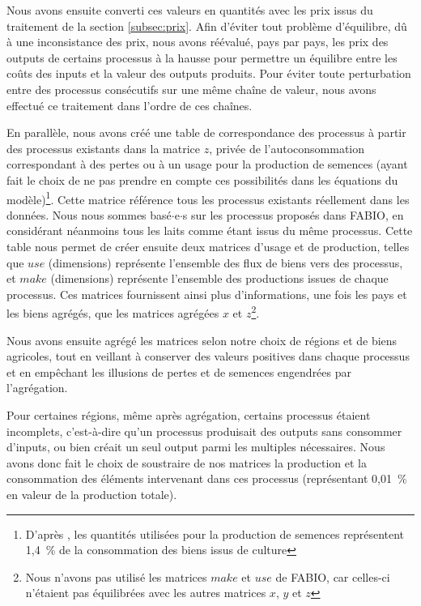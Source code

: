 Nous avons ensuite converti ces valeurs en quantités avec les prix issus du traitement de la section \ref{subsec:prix}. Afin d'éviter tout problème d'équilibre, dû à une inconsistance des prix, nous avons réévalué, pays par pays, les prix des outputs de certains processus à la hausse pour permettre un équilibre entre les coûts des inputs et la valeur des outputs produits. Pour éviter toute perturbation entre des processus consécutifs sur une même chaîne de valeur, nous avons effectué ce traitement dans l'ordre de ces chaînes.

En parallèle, nous avons créé une table de correspondance des processus à partir des processus existants dans la matrice $z$, privée de l'autoconsommation correspondant à des pertes ou à un usage pour la production de semences (ayant fait le choix de ne pas prendre en compte ces possibilités dans les équations du modèle)\footnote{D'après \cite{Bruckner2019}, les quantités utilisées pour la production de semences représentent 1,4~\% de la consommation des biens issus de culture}. Cette matrice référence tous les processus existants réellement dans les données. Nous nous sommes basé$\cdot$e$\cdot$s sur les processus proposés dans FABIO, en considérant néanmoins tous les laits comme étant issus du même processus. Cette table nous permet de créer ensuite deux matrices d'usage et de production, telles que $use$ (dimensions) représente l'ensemble des flux de biens vers des processus, et $make$ (dimensions) représente l'ensemble des productions issues de chaque processus. Ces matrices fournissent ainsi plus d'informations, une fois les pays et les biens agrégés, que les matrices agrégées $x$ et $z$\footnote{Nous n'avons pas utilisé les matrices $make$ et $use$ de FABIO, car celles-ci n'étaient pas équilibrées avec les autres matrices $x$, $y$ et $z$}.

Nous avons ensuite agrégé les matrices selon notre choix de régions et de biens agricoles, tout en veillant à conserver des valeurs positives dans chaque processus et en empêchant les illusions de pertes et de semences engendrées par l'agrégation.

Pour certaines régions, même après agrégation, certains processus étaient incomplets, c'est-à-dire qu'un processus produisait des outputs sans consommer d'inputs, ou bien créait un seul output parmi les multiples nécessaires. Nous avons donc fait le choix de soustraire de nos matrices la production et la consommation des éléments intervenant dans ces processus (représentant 0,01~\% en valeur de la production totale).


